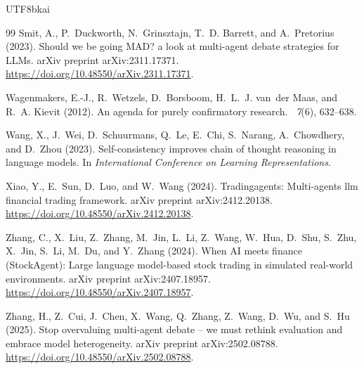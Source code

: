 \documentclass[12pt,a4paper]{article}
\begin{document}
\begin{CJK}{UTF8}{bkai}
\begin{thebibliography}{99}
Smit, A., P.~Duckworth, N.~Grinsztajn, T.~D. Barrett, and A.~Pretorius (2023).
\newblock Should we be going {MAD}? a look at multi-agent debate strategies for
  {LLMs}.
\newblock arXiv preprint arXiv:2311.17371.
\newblock \url{https://doi.org/10.48550/arXiv.2311.17371}.

Wagenmakers, E.-J., R.~Wetzels, D.~Borsboom, H.~L.~J. van~der Maas, and R.~A.
  Kievit (2012).
\newblock An agenda for purely confirmatory research.
~{\em 7\/}(6), 632--638.

Wang, X., J.~Wei, D.~Schuurmans, Q.~Le, E.~Chi, S.~Narang, A.~Chowdhery, and
  D.~Zhou (2023).
\newblock Self-consistency improves chain of thought reasoning in language
  models.
\newblock In {\em International Conference on Learning Representations}.

Xiao, Y., E.~Sun, D.~Luo, and W.~Wang (2024).
\newblock Tradingagents: Multi-agents llm financial trading framework.
\newblock arXiv preprint arXiv:2412.20138.
\newblock \url{https://doi.org/10.48550/arXiv.2412.20138}.

Zhang, C., X.~Liu, Z.~Zhang, M.~Jin, L.~Li, Z.~Wang, W.~Hua, D.~Shu, S.~Zhu,
  X.~Jin, S.~Li, M.~Du, and Y.~Zhang (2024).
\newblock When {AI} meets finance ({StockAgent}): Large language model-based
  stock trading in simulated real-world environments.
\newblock arXiv preprint arXiv:2407.18957.
\newblock \url{https://doi.org/10.48550/arXiv.2407.18957}.

Zhang, H., Z.~Cui, J.~Chen, X.~Wang, Q.~Zhang, Z.~Wang, D.~Wu, and S.~Hu
  (2025).
\newblock Stop overvaluing multi-agent debate -- we must rethink evaluation and
  embrace model heterogeneity.
\newblock arXiv preprint arXiv:2502.08788.
\newblock \url{https://doi.org/10.48550/arXiv.2502.08788}.


\end{thebibliography}
\end{CJK}
\end{document}
